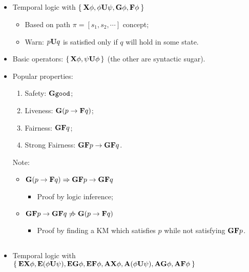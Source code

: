\subsection{\LTL}

    \begin{itemize}

    \item   Temporal logic with
            $\Set{ \X{\phi}, \U{\phi}{\psi}, \G{\phi}, \F{\phi} }$

        \begin{itemize}
        \item   Based on path $\pi = [s_1, s_2, \cdots ]$ concept;
        \item   Warn: $\U{p}{q}$ is satisfied only if $q$ will hold in
                some state.
        \end{itemize}

    \item   Basic operators: $\set{ \X{\phi}, \U{\psi}{\phi} }$ (the other
            are syntactic sugar).

    \item   Popular properties:

        \begin{enumerate}
        \item   Safety: $\G{\Good}$;
        \item   Liveness: $\G{(p \imply \F{q})}$;
        \item   Fairness: $\G{\F{q}}$;
        \item   Strong Fairness: $\G{\F{p}} \imply \G{\F{q}}$.
        \end{enumerate}

        Note:
        \begin{itemize}
        \item   $\G{(p \imply \F{q})} \Imply \G{\F{p}} \imply \G{\F{q}}$
            \begin{itemize}
            \item   Proof by logic inference;
            \end{itemize}
        \item   $\G{\F{p}} \imply \G{\F{q}} \not\Imply
                 \G{(p \imply \F{q})}$
            \begin{itemize}
                \item   Proof by finding a KM which satisfies $p$ while not
                        satisfying $\G{\F{p}}$.
            \end{itemize}
        \end{itemize}

    \end{itemize}

\subsection{\CTL}

    \begin{itemize}

    \item   Temporal logic with
            $\Set{ \EX{\phi}, \EU{\phi}{\psi}, \EG{\phi}, \EF{\phi},
                   \AX{\phi}, \AU{\phi}{\psi}, \AG{\phi}, \AF{\phi} }$

    \end{itemize}


